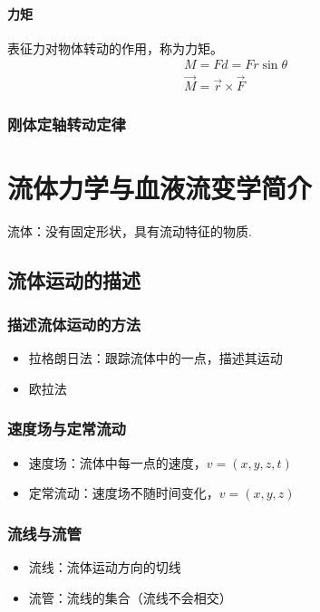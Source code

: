 \documentclass[12pt, a4paper, oneside]{ctexbook}
\begin{document}
\subsubsection{力矩}
表征力对物体转动的作用，称为力矩。
\begin{align*}
    M = Fd = Fr\sin{\theta} \\
    \overrightarrow{M} = \overrightarrow{r} \times \overrightarrow{F}
\end{align*}
\subsection{刚体定轴转动定律}









\chapter{流体力学与血液流变学简介}
流体：没有固定形状，具有流动特征的物质.

\section{流体运动的描述}
\subsection{描述流体运动的方法}
\begin{itemize}
    \item 拉格朗日法：跟踪流体中的一点，描述其运动
    \item 欧拉法
\end{itemize}   

\subsection{速度场与定常流动}
\begin{itemize}
    \item 速度场：流体中每一点的速度，$v = (x, y, z, t)$
    \item 定常流动：速度场不随时间变化，$v = (x, y, z)$
\end{itemize}

\subsection{流线与流管}
\begin{itemize}
    \item 流线：流体运动方向的切线
    \item 流管：流线的集合（流线不会相交）
\end{itemize}
\end{document}
